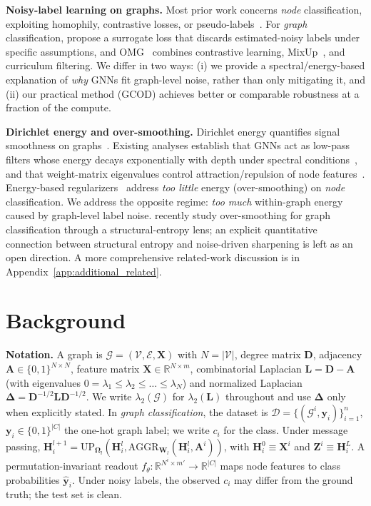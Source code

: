 \documentclass{article}
\theoremstyle{definition}
\newcommand{\method}{GCOD}
\begin{document}
\textbf{Noisy-label learning on graphs.} Most prior work concerns \emph{node} classification, exploiting homophily, contrastive losses, or pseudo-labels~\citep{nrgnn11,contrastivelearning5,ssl8,cl9,Kang2018RobustGL}. For \emph{graph} classification, \citet{graphC1} propose a surrogate loss that discards estimated-noisy labels under specific assumptions, and OMG~\citep{omg7} combines contrastive learning, MixUp~\citep{mixup2}, and curriculum filtering. We differ in two ways: (i) we provide a spectral/energy-based explanation of \emph{why} GNNs fit graph-level noise, rather than only mitigating it, and (ii) our practical method (\method{}) achieves better or comparable robustness at a fraction of the compute.

\textbf{Dirichlet energy and over-smoothing.} Dirichlet energy quantifies signal smoothness on graphs~\citep{dirichlet}. Existing analyses establish that GNNs act as low-pass filters whose energy decays exponentially with depth under spectral conditions~\citep{nt2019revisiting,noteonoversmoothing,oversmoothing2,rusch2023survey}, and that weight-matrix eigenvalues control attraction/repulsion of node features~\citep{GRAFF}. Energy-based regularizers~\citep{zhou2021dirichlet,FAGCN,EEConv} address \emph{too little} energy (over-smoothing) on \emph{node} classification. We address the opposite regime: \emph{too much} within-graph energy caused by graph-level label noise. \citet{exploreOversmoothing} recently study over-smoothing for graph classification through a structural-entropy lens; an explicit quantitative connection between structural entropy and noise-driven sharpening is left as an open direction. A more comprehensive related-work discussion is in Appendix~\ref{app:additional_related}.

\section{Background}
\label{sec:background}

\textbf{Notation.} A graph is $\mathcal{G}=(\mathcal{V},\mathcal{E},\mathbf{X})$ with $N=|\mathcal{V}|$, degree matrix $\mathbf{D}$, adjacency $\mathbf{A}\in\{0,1\}^{N\times N}$, feature matrix $\mathbf{X}\in\mathbb{R}^{N\times m}$, combinatorial Laplacian $\mathbf{L}=\mathbf{D}-\mathbf{A}$ (with eigenvalues $0=\lambda_1\le\lambda_2\le\dots\le\lambda_N$) and normalized Laplacian $\mathbf{\Delta}=\mathbf{D}^{-1/2}\mathbf{L}\mathbf{D}^{-1/2}$. We write $\lambda_2(\mathcal{G})$ for $\lambda_2(\mathbf{L})$ throughout and use $\mathbf{\Delta}$ only when explicitly stated. In \emph{graph classification}, the dataset is $\mathcal{D}=\{(\mathcal{G}^i,\mathbf{y}_i)\}_{i=1}^n$, $\mathbf{y}_i\in\{0,1\}^{|C|}$ the one-hot graph label; we write $c_i$ for the class. Under message passing, $\mathbf{H}_i^{l+1}=\mathrm{UP}_{\mathbf{\Omega}_l}(\mathbf{H}_i^l,\mathrm{AGGR}_{\mathbf{W}_l}(\mathbf{H}_i^l,\mathbf{A}^i))$, with $\mathbf{H}_i^0\equiv\mathbf{X}^i$ and $\mathbf{Z}^i\equiv\mathbf{H}_i^L$. A permutation-invariant readout $f_\theta:\mathbb{R}^{N^i\times m'}\to\mathbb{R}^{|C|}$ maps node features to class probabilities $\hat{\mathbf{y}}_i$. Under noisy labels, the observed $c_i$ may differ from the ground truth; the test set is clean.
\end{document}
